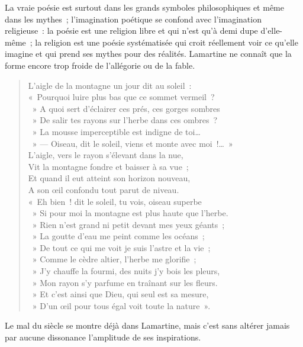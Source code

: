 \documentclass[french,twoside]{book} %
\begin{document}
\noindent La vraie poésie est surtout dans les grands symboles philosophiques et même dans les mythes ; l’imagination poétique se confond avec l’imagination religieuse : la poésie est une religion libre et qui n’est qu’à demi dupe d’elle-même ; la religion est une poésie systématisée qui croit réellement voir ce qu’elle imagine et qui prend ses mythes pour des réalités. Lamartine ne connaît que la forme encore trop froide de l’allégorie ou de la fable.\par


\begin{verse}
L’aigle de la montagne un jour dit au soleil :\\
« Pourquoi luire plus bas que ce sommet vermeil ?\\
 » A quoi sert d’éclairer ces prés, ces gorges sombres \\
 » De salir tes rayons sur l’herbe dans ces ombres ?\\
 » La mousse imperceptible est indigne de toi…\\
 » — Oiseau, dit le soleil, viens et monte avec moi !… »\\
L’aigle, vers le rayon s’élevant dans la nue,\\
Vit la montagne fondre et baisser à sa vue ;\\
Et quand il eut atteint son horizon nouveau,\\
A son œil confondu tout parut de niveau.\\
« Eh bien ! dit le soleil, tu vois, oiseau superbe \\
 » Si pour moi la montagne est plus haute que l’herbe.\\
 » Rien n’est grand ni petit devant mes yeux géants ;\\
 » La goutte d’eau me peint comme les océans ;\\
 » De tout ce qui me voit je suis l’astre et la vie ;\\
 » Comme le cèdre altier, l’herbe me glorifie ;\\
 » J’y chauffe la fourmi, des nuits j’y bois les pleurs,\\
 » Mon rayon s’y parfume en traînant sur les fleurs.\\
 » Et c’est ainsi que Dieu, qui seul est sa mesure,\\
 » D’un œil pour tous égal voit toute la nature ».\\
\end{verse}

\noindent Le mal du siècle se montre déjà dans Lamartine, mais c’est sans altérer jamais par aucune dissonance l’amplitude de ses inspirations.\par
\end{document}

